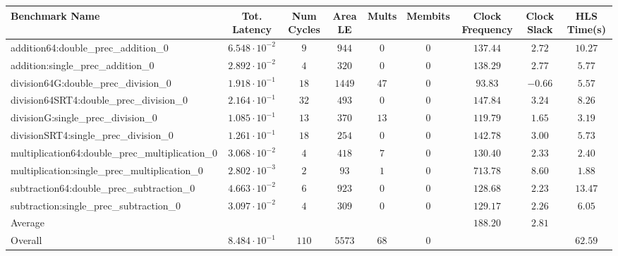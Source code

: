 \begin{tabular}{|l|c|c|c|c|c|c|c|c|}
\hline
Benchmark Name                                   & Tot. Latency            & Num Cycles & Area LE  & Mults  & Membits & Clock Frequency & Clock Slack & HLS Time(s) \\
\hline
addition64:double\_prec\_addition\_0             & $ 6.548 \cdot 10^{-2} $ & $ 9      $ & $ 944  $ & $ 0  $ & $ 0   $ & $ 137.44      $ & $ 2.72    $ & $ 10.27   $ \\
addition:single\_prec\_addition\_0               & $ 2.892 \cdot 10^{-2} $ & $ 4      $ & $ 320  $ & $ 0  $ & $ 0   $ & $ 138.29      $ & $ 2.77    $ & $ 5.77    $ \\
division64G:double\_prec\_division\_0            & $ 1.918 \cdot 10^{-1} $ & $ 18     $ & $ 1449 $ & $ 47 $ & $ 0   $ & $ 93.83       $ & $ -0.66   $ & $ 5.57    $ \\
division64SRT4:double\_prec\_division\_0         & $ 2.164 \cdot 10^{-1} $ & $ 32     $ & $ 493  $ & $ 0  $ & $ 0   $ & $ 147.84      $ & $ 3.24    $ & $ 8.26    $ \\
divisionG:single\_prec\_division\_0              & $ 1.085 \cdot 10^{-1} $ & $ 13     $ & $ 370  $ & $ 13 $ & $ 0   $ & $ 119.79      $ & $ 1.65    $ & $ 3.19    $ \\
divisionSRT4:single\_prec\_division\_0           & $ 1.261 \cdot 10^{-1} $ & $ 18     $ & $ 254  $ & $ 0  $ & $ 0   $ & $ 142.78      $ & $ 3.00    $ & $ 5.73    $ \\
multiplication64:double\_prec\_multiplication\_0 & $ 3.068 \cdot 10^{-2} $ & $ 4      $ & $ 418  $ & $ 7  $ & $ 0   $ & $ 130.40      $ & $ 2.33    $ & $ 2.40    $ \\
multiplication:single\_prec\_multiplication\_0   & $ 2.802 \cdot 10^{-3} $ & $ 2      $ & $ 93   $ & $ 1  $ & $ 0   $ & $ 713.78      $ & $ 8.60    $ & $ 1.88    $ \\
subtraction64:double\_prec\_subtraction\_0       & $ 4.663 \cdot 10^{-2} $ & $ 6      $ & $ 923  $ & $ 0  $ & $ 0   $ & $ 128.68      $ & $ 2.23    $ & $ 13.47   $ \\
subtraction:single\_prec\_subtraction\_0         & $ 3.097 \cdot 10^{-2} $ & $ 4      $ & $ 309  $ & $ 0  $ & $ 0   $ & $ 129.17      $ & $ 2.26    $ & $ 6.05    $ \\
\hline
Average                                          & $                     $ & $        $ & $      $ & $    $ & $     $ & $ 188.20      $ & $ 2.81    $ & $         $ \\
\hline
Overall                                          & $ 8.484 \cdot 10^{-1} $ & $ 110    $ & $ 5573 $ & $ 68 $ & $ 0   $ & $             $ & $         $ & $ 62.59   $ \\
\hline
\end{tabular}
